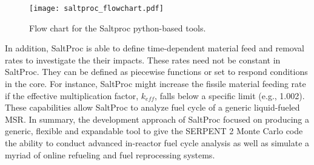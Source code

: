 \begin{figure}[htp!] %
  \centering
  \vspace{-0.3em}
  \texttt{[image: saltproc\_flowchart.pdf]}
  \caption{Flow chart for the Saltproc python-based tools.}
  \vspace{-1.0em}
  \label{fig:saltproc_flow}
\end{figure}
\FloatBarrier

In addition, SaltProc is able to define time-dependent material feed and removal rates to investigate the their impacts. These rates need not be
constant in SaltProc. They can be defined as piecewise functions or set to respond conditions in the core. For instance, SaltProc might increase the
fissile material feeding rate if the effective multiplication factor, $k_{eff}$, falls below a specific limit (e.g., 1.002).
These capabilities allow SaltProc to analyze fuel cycle of a generic liquid-fueled \gls{MSR}. In summary, the development approach of SaltProc focused
on producing a generic, flexible and expandable tool to give the SERPENT 2 Monte Carlo code the ability to conduct advanced in-reactor
fuel cycle analysis as well as simulate a myriad of online refueling and fuel reprocessing systems.
